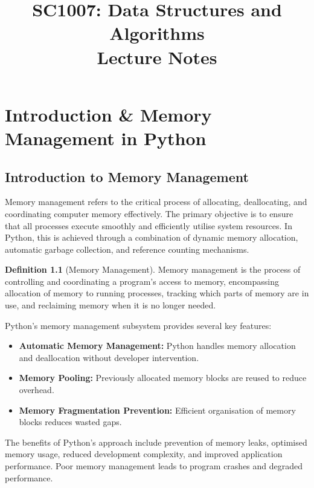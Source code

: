 \documentclass[11pt, a4paper, notitlepage]{report}
\title{\textbf{SC1007: Data Structures and Algorithms}\\[0.5em]
       \large Lecture Notes}
\author{}
\date{}
\makeatletter
\theoremstyle{definition}
\newtheorem{definition}[theorem]{Definition}
\theoremstyle{remark}
\theoremstyle{definition}
\renewcommand\tableofcontents{%
  \section*{\contentsname}%
  \@starttoc{toc}%
}
\makeatother
\begin{document}
\maketitle
\tableofcontents
\newpage

\chapter{Introduction \& Memory Management in Python}
\label{ch:memory-management}

\section{Introduction to Memory Management}
\label{sec:intro-mm}

Memory management refers to the critical process of allocating, deallocating, and coordinating
computer memory effectively. The primary objective is to ensure that all processes execute
smoothly and efficiently utilise system resources. In Python, this is achieved through a
combination of dynamic memory allocation, automatic garbage collection, and reference counting
mechanisms.

\begin{definition}[Memory Management]
\label{def:memory-management}
Memory management is the process of controlling and coordinating a program's access to memory,
encompassing allocation of memory to running processes, tracking which parts of memory are in
use, and reclaiming memory when it is no longer needed.
\end{definition}

Python's memory management subsystem provides several key features:
\begin{itemize}
  \item \textbf{Automatic Memory Management:} Python handles memory allocation and
        deallocation without developer intervention.
  \item \textbf{Memory Pooling:} Previously allocated memory blocks are reused to
        reduce overhead.
  \item \textbf{Memory Fragmentation Prevention:} Efficient organisation of memory
        blocks reduces wasted gaps.
\end{itemize}

The benefits of Python's approach include prevention of memory leaks, optimised memory usage,
reduced development complexity, and improved application performance. Poor memory management
leads to program crashes and degraded performance.
\end{document}
